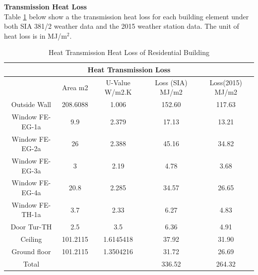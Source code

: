 \documentclass[11pt, a4paper]{article}
\theoremstyle{definition}
\begin{document}
		\textbf{Transmission Heat Loss}\\
		Table \ref{tab:HonggTransmission} below show a the transmission heat loss for each building element under both SIA 381/2 weather data and the 2015 weather station data. The unit of heat loss is in MJ/m$^2$.
		\begin{table}[htbp]
		\small
		\centering
		\caption{Heat Transmission Heat Loss of Residential Building}
		    \begin{tabular}{|ccccc|}
		    \toprule
		    \multicolumn{5}{|c|}{\textbf{Heat Transmission Loss}} \\
		    \midrule
		          & \multicolumn{1}{p{4.785em}}{Area m2} & \multicolumn{1}{p{4.785em}}{U-Value W/m2.K} & \multicolumn{1}{p{5.715em}}{Loss (SIA) MJ/m2} & \multicolumn{1}{p{5.715em}|}{Loss(2015) MJ/m2} \\
		    \midrule
		    Outside Wall & 208.6088 & 1.006 & 152.60 & 117.63 \\
		    Window FE-EG-1a & 9.9   & 2.379 & 17.13 & 13.21 \\
		    Window FE-EG-2a & 26    & 2.388 & 45.16 & 34.82 \\
		    Window FE-EG-3a & 3     & 2.19  & 4.78  & 3.68 \\
		    Window FE-EG-4a & 20.8  & 2.285 & 34.57 & 26.65 \\
		    Window FE-TH-1a & 3.7   & 2.33  & 6.27  & 4.83 \\
		    Door Tur-TH & 2.5   & 3.5   & 6.36  & 4.91 \\
		    Ceiling & 101.2115 & 1.6145418 & 37.92 & 31.90 \\
		    Ground floor & 101.2115 & 1.3504216 & 31.72 & 26.69 \\
		    \midrule
		    Total &       &       & 336.52 & 264.32 \\
		    \bottomrule
		    \end{tabular}%
		  \label{tab:HonggTransmission}%
		\end{table}%
\end{document}
